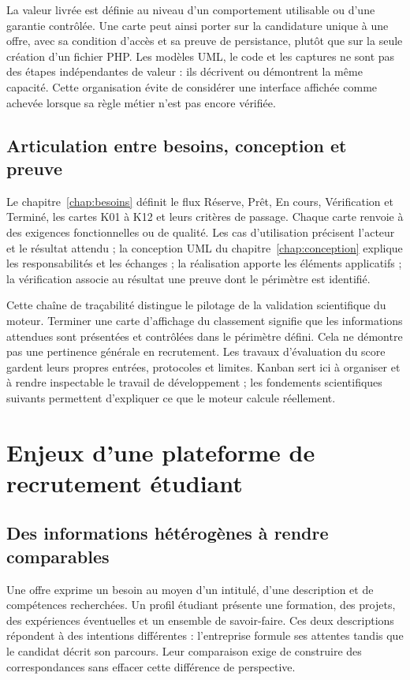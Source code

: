 La valeur livrée est définie au niveau d'un comportement utilisable ou d'une garantie contrôlée. Une carte peut ainsi porter sur la candidature unique à une offre, avec sa condition d'accès et sa preuve de persistance, plutôt que sur la seule création d'un fichier PHP. Les modèles UML, le code et les captures ne sont pas des étapes indépendantes de valeur : ils décrivent ou démontrent la même capacité. Cette organisation évite de considérer une interface affichée comme achevée lorsque sa règle métier n'est pas encore vérifiée.

\subsection{Articulation entre besoins, conception et preuve}

Le chapitre~\ref{chap:besoins} définit le flux Réserve, Prêt, En cours, Vérification et Terminé, les cartes K01 à K12 et leurs critères de passage. Chaque carte renvoie à des exigences fonctionnelles ou de qualité. Les cas d'utilisation précisent l'acteur et le résultat attendu ; la conception UML du chapitre~\ref{chap:conception} explique les responsabilités et les échanges ; la réalisation apporte les éléments applicatifs ; la vérification associe au résultat une preuve dont le périmètre est identifié.

Cette chaîne de traçabilité distingue le pilotage de la validation scientifique du moteur. Terminer une carte d'affichage du classement signifie que les informations attendues sont présentées et contrôlées dans le périmètre défini. Cela ne démontre pas une pertinence générale en recrutement. Les travaux d'évaluation du score gardent leurs propres entrées, protocoles et limites. Kanban sert ici à organiser et à rendre inspectable le travail de développement ; les fondements scientifiques suivants permettent d'expliquer ce que le moteur calcule réellement.

\section{Enjeux d'une plateforme de recrutement étudiant}

\subsection{Des informations hétérogènes à rendre comparables}

Une offre exprime un besoin au moyen d'un intitulé, d'une description et de compétences recherchées. Un profil étudiant présente une formation, des projets, des expériences éventuelles et un ensemble de savoir-faire. Ces deux descriptions répondent à des intentions différentes : l'entreprise formule ses attentes tandis que le candidat décrit son parcours. Leur comparaison exige de construire des correspondances sans effacer cette différence de perspective.


